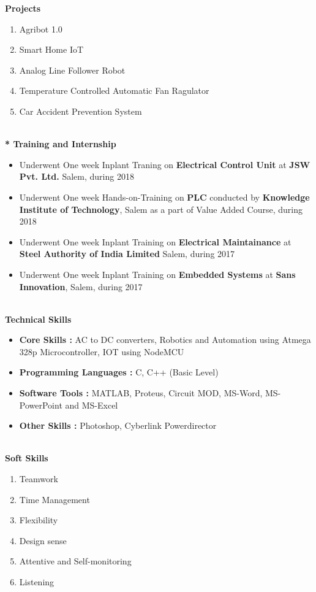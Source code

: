 \documentclass{article}
\begin{document}
	\begin{flushleft}
		\Large \textbf{Projects}
		\begin{enumerate}
			\item Agribot 1.0
			\item Smart Home IoT
			\item Analog Line Follower Robot
			\item Temperature Controlled Automatic Fan Ragulator
			\item Car Accident Prevention System
		\end{enumerate}
		
		\Large \textbf{\\* Training and Internship}\
		
		\begin{itemize}
			\item Underwent One week Inplant Traning on \textbf{Electrical Control Unit} at \textbf{JSW Pvt. Ltd.} Salem, during 2018
			\item Underwent One week Hands-on-Training on \textbf{PLC} conducted by \textbf{Knowledge Institute of Technology}, Salem as a part of Value Added Course, during 2018 
			\item Underwent One week Inplant Training on \textbf{Electrical Maintainance} at \textbf{Steel Authority of India Limited} Salem, during 2017
			\item Underwent One week Inplant Training on \textbf{Embedded Systems} at \textbf{Sans Innovation}, Salem, during 2017 
		\end{itemize}
		
		\Large \textbf{\\Technical Skills}\
		\begin{itemize}
			\item \textbf{Core Skills	:} AC to DC converters,	Robotics and Automation using Atmega 328p Microcontroller, IOT using NodeMCU
			\item \textbf{Programming Languages	:}	C, C++ (Basic Level)
			\item \textbf{Software Tools	:}	MATLAB, Proteus, Circuit MOD, MS-Word, MS-PowerPoint and MS-Excel
			\item \textbf{Other Skills	:} Photoshop, Cyberlink Powerdirector
		\end{itemize}
		
		\Large \textbf{\\Soft Skills}\
		\begin{enumerate}
			\item Teamwork
			\item Time Management
			\item Flexibility
			\item Design sense
			\item Attentive and Self-monitoring
			\item Listening
		\end{enumerate}
		

\end{flushleft}
\end{document}
